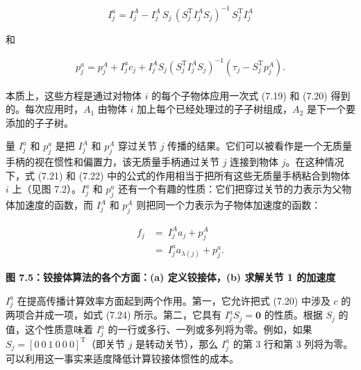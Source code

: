 \documentclass[10pt,a4paper]{book}
\theoremstyle{thmstyle} %
\theoremstyle{defstyle} %
\theoremstyle{prostyle} %
\begin{document}
$$
I _ { j } ^{a} = I _ { j } ^{A} - I _ { j } ^{A} \, S _ { j } \, ( S _ { j } ^{\mathrm { T} } I _ { j } ^{A} S _ { j } ) ^{- 1} \, S _ { j } ^{\mathrm { T} } I _ { j } ^{A}
$$



和



$$
\begin{array}{r} { p _ { j } ^{a} = p _ { j } ^{A} + I _ { j } ^{a} c _ { j } + I _ { j } ^{A} S _ { j } \left( S _ { j } ^{\mathrm { T} } I _ { j } ^{A} S _ { j } \right) ^{- 1} \left( \tau _ { j } - S _ { j } ^{\mathrm { T} } p _ { j } ^{A} \right) . } \end{array}
$$



本质上，这些方程是通过对物体 $i$ 的每个子物体应用一次式 (7.19) 和 (7.20) 得到的。每次应用时，$A_1$ 由物体 $i$ 加上每个已经处理过的子子树组成，$A_2$ 是下一个要添加的子子树。



量 $I_{j}^{a}$ 和 $p_{j}^{a}$ 是把 $I_{j}^{A}$ 和 $p_{j}^{A}$ 穿过关节 $j$ 传播的结果。它们可以被看作是一个无质量手柄的视在惯性和偏置力，该无质量手柄通过关节 $j$ 连接到物体 $j$。在这种情况下，式 (7.21) 和 (7.22) 中的公式的作用相当于把所有这些无质量手柄粘合到物体 $i$ 上（见图 7.2）。$I_{j}^{a}$ 和 $p_{j}^{a}$ 还有一个有趣的性质：它们把穿过关节的力表示为父物体加速度的函数，而 $I_{j}^{A}$ 和 $p_{j}^{A}$ 则把同一个力表示为子物体加速度的函数：



$$
\begin{array}{rl} { f _ { j } } & { = \ I _ { j } ^{A} a _ { j } + p _ { j } ^{A} } \\& { = \ I _ { j } ^{a} a _ { \lambda ( j ) } + p _ { j } ^{a} . } \end{array}
$$



\noindent\textbf{图 7.5：铰接体算法的各个方面：(a) 定义铰接体，(b) 求解关节 1 的加速度}





$I_{j}^{a}$ 在提高传播计算效率方面起到两个作用。第一，它允许把式 (7.20) 中涉及 $c$ 的两项合并成一项，如式 (7.24) 所示。第二，它具有 $I_{j}^{a}S_{j}=\mathbf{0}$ 的性质。根据 $S_{j}$ 的值，这个性质意味着 $I_{j}^{a}$ 的一行或多行、一列或多列将为零。例如，如果 $S_{j}=[0\ 0\ 1\ 0\ 0\ 0]^{\mathrm{T}}$（即关节 $j$ 是转动关节），那么 $I_{j}^{a}$ 的第 3 行和第 3 列将为零。可以利用这一事实来适度降低计算铰接体惯性的成本。
\end{document}
